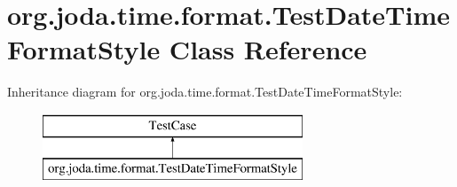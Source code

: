 \hypertarget{classorg_1_1joda_1_1time_1_1format_1_1_test_date_time_format_style}{\section{org.\-joda.\-time.\-format.\-Test\-Date\-Time\-Format\-Style Class Reference}
\label{classorg_1_1joda_1_1time_1_1format_1_1_test_date_time_format_style}
}
Inheritance diagram for org.\-joda.\-time.\-format.\-Test\-Date\-Time\-Format\-Style\-:\begin{figure}[H]
\begin{center}
\leavevmode
\includegraphics[height=2.000000cm]{classorg_1_1joda_1_1time_1_1format_1_1_test_date_time_format_style}
\end{center}
\end{figure}
